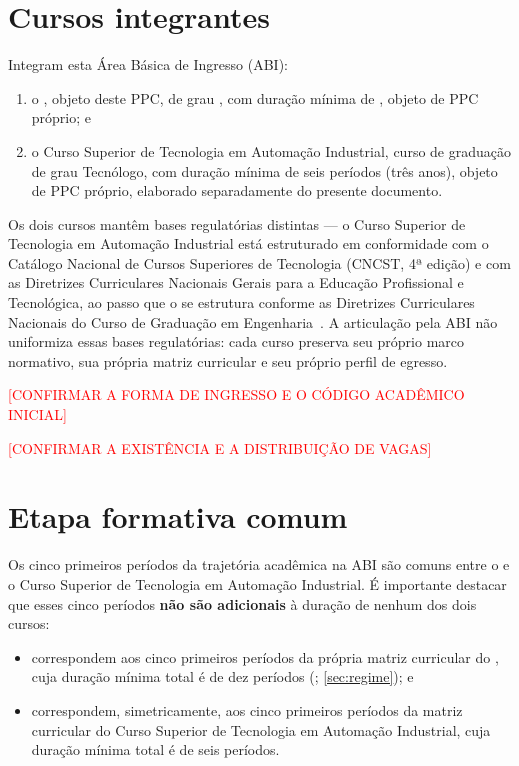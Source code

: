 \section{Cursos integrantes}

Integram esta Área Básica de Ingresso (ABI):

\begin{enumerate}
    \item o \ppccurso, objeto deste PPC, de grau \ppcgrau, com duração mínima de \ppctempominimo, objeto de PPC próprio; e
    \item o Curso Superior de Tecnologia em Automação Industrial, curso de graduação de grau Tecnólogo, com duração mínima de seis períodos (três anos), objeto de PPC próprio, elaborado separadamente do presente documento.
\end{enumerate}

Os dois cursos mantêm bases regulatórias distintas — o Curso Superior de Tecnologia em Automação Industrial está estruturado em conformidade com o Catálogo Nacional de Cursos Superiores de Tecnologia (CNCST, 4ª edição) e com as Diretrizes Curriculares Nacionais Gerais para a Educação Profissional e Tecnológica, ao passo que o \ppccurso se estrutura conforme as Diretrizes Curriculares Nacionais do Curso de Graduação em Engenharia~\cite{cne_ces_2_2019,cne_ces_1_2021}. A articulação pela ABI não uniformiza essas bases regulatórias: cada curso preserva seu próprio marco normativo, sua própria matriz curricular e seu próprio perfil de egresso.

\textcolor{red}{[CONFIRMAR A FORMA DE INGRESSO E O CÓDIGO ACADÊMICO INICIAL]}

\textcolor{red}{[CONFIRMAR A EXISTÊNCIA E A DISTRIBUIÇÃO DE VAGAS]}

\section{Etapa formativa comum}
\label{sec:etapa_comum}

Os cinco primeiros períodos da trajetória acadêmica na ABI são comuns entre o \ppccurso e o Curso Superior de Tecnologia em Automação Industrial. É importante destacar que esses cinco períodos \textbf{não são adicionais} à duração de nenhum dos dois cursos:

\begin{itemize}
    \item correspondem aos cinco primeiros períodos da própria matriz curricular do \ppccurso, cuja duração mínima total é de dez períodos (\ppctempominimo; \autoref{sec:regime}); e
    \item correspondem, simetricamente, aos cinco primeiros períodos da matriz curricular do Curso Superior de Tecnologia em Automação Industrial, cuja duração mínima total é de seis períodos.
\end{itemize}

